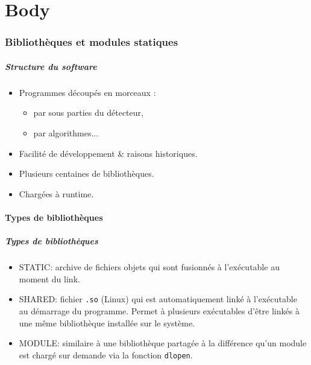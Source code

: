 \documentclass{beamer}
\begin{document}
\part{Body}
\begin{frame}
    \tableofcontents
\end{frame}

\section{Bibliothèques et modules statiques}

\begin{frame}
    \tableofcontents[currentsection]
\end{frame}

\begin{frame}[fragile]
    \frametitle{Structure du software}

    \begin{itemize}
        \item Programmes découpés en morceaux :
        \begin{itemize}
            \item par sous parties du détecteur,
            \item par algorithmes...
        \end{itemize}
        \item Facilité de développement \& raisons historiques.
        \item Plusieurs centaines de bibliothèques.
        \item Chargées à runtime.
    \end{itemize}
\end{frame}

\subsection{Types de bibliothèques}

\begin{frame}[fragile]
    \frametitle{Types de bibliothèques}

    \begin{itemize}
        \item STATIC: archive de fichiers objets qui sont fusionnés à l'exécutable au moment du link.
        \item SHARED: fichier \verb'.so' (Linux) qui est automatiquement linké à l'exécutable au démarrage du programme.
              Permet à plusieurs exécutables d'être linkés à une même bibliothèque installée sur le système.
        \item MODULE: similaire à une bibliothèque partagée à la différence qu'un module est chargé sur demande via la fonction \verb'dlopen'.
    \end{itemize}
\end{frame}
\end{document}
